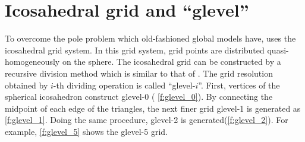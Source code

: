 \section{Icosahedral grid and ``glevel''}\label{s:ico_grid_glevel}

To overcome the pole problem which old-fashioned global models have,
\NICAM uses the icosahedral grid system.
In this grid system, grid points are distributed quasi-homogeneously on
the sphere.
%
The icosahedral grid can be constructed by a recursive division method
which is similar to that of \cite{Stuhne:1996fr}.
%
The grid resolution obtained by $i$-th dividing operation is called
``glevel-$i$''.
%
First, vertices of the spherical icosahedron construct glevel-0 (
\autoref{f:glevel_0}).
%
By connecting the midpoint of each edge of the triangles, the next finer
grid glevel-1 is generated as \autoref{f:glevel_1}.
%
Doing the same procedure, glevel-2 is
generated(\autoref{f:glevel_2}).
%
For example, \autoref{f:glevel_5} shows the
glevel-5 grid.

